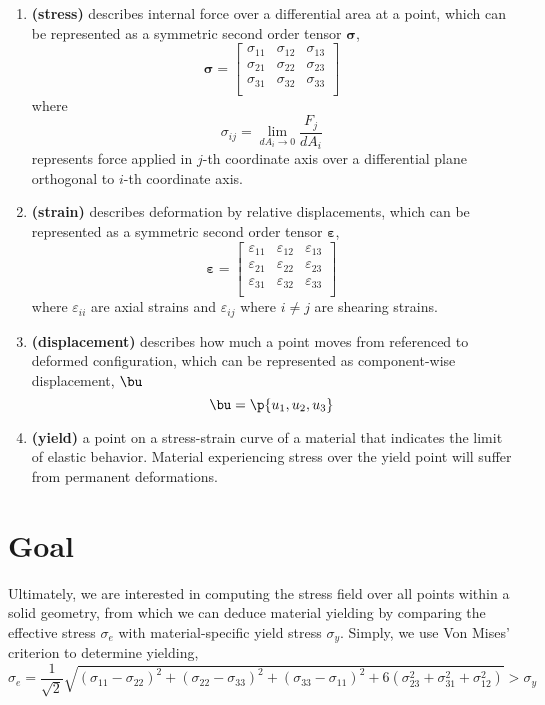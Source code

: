 \documentclass[11pt]{article}
\newcommand{\bheading}[1]{\textbf{(#1)}}
\newcommand{\bsigma}{\boldsymbol{\sigma}}
\newcommand{\bepsilon}{\boldsymbol{\varepsilon}}
\renewcommand{\epsilon}{\varepsilon}
\begin{document}
\begin{enumerate}
    \item \bheading{stress} describes internal force over a differential area at a point, which can be represented as a symmetric second order tensor $\bsigma$,
    \[
        \bsigma = 
        \begin{bmatrix}
            \sigma_{11} & \sigma_{12} & \sigma_{13} \\
            \sigma_{21} & \sigma_{22} & \sigma_{23} \\
            \sigma_{31} & \sigma_{32} & \sigma_{33} \\
        \end{bmatrix}    
    \]
    where
    \[
        \sigma_{ij} = \lim_{dA_i \to 0} \dfrac{F_j}{dA_i}
    \] 
    represents force applied in $j$-th coordinate axis over a differential plane orthogonal to $i$-th coordinate axis. 
    \item \bheading{strain} describes deformation by relative displacements, which can be represented as a symmetric second order tensor $\bepsilon$,
    \[
        \bepsilon = 
        \begin{bmatrix}
            \epsilon_{11} & \epsilon_{12} & \epsilon_{13} \\
            \epsilon_{21} & \epsilon_{22} & \epsilon_{23} \\
            \epsilon_{31} & \epsilon_{32} & \epsilon_{33} \\
        \end{bmatrix}
    \]
    where $\epsilon_{ii}$ are axial strains and $\epsilon_{ij}$ where $i\neq j$ are shearing strains.
    \item \bheading{displacement} describes how much a point moves from referenced to deformed configuration, which can be represented as component-wise displacement, $\bu$
    \[
        \bu = \p{u_1, u_2, u_3}
    \]
    \item \bheading{yield} a point on a stress-strain curve of a material that indicates the limit of elastic behavior. Material experiencing stress over the yield point will suffer from permanent deformations.
\end{enumerate}


\section*{Goal}

Ultimately, we are interested in computing the stress field over all points within a solid geometry, from which we can deduce material yielding by comparing the effective stress $\sigma_e$ with material-specific yield stress $\sigma_y$. Simply, we use Von Mises' criterion to determine yielding, 
\[
    \sigma_e = \frac{1}{\sqrt{2}}\sqrt{
        (\sigma_{11} - \sigma_{22})^2 
        + (\sigma_{22} - \sigma_{33})^2 
        + (\sigma_{33} - \sigma_{11})^2
        + 6(\sigma_{23}^2 + \sigma_{31}^2 + \sigma_{12}^2)
    } > \sigma_y
\]
\end{document}
